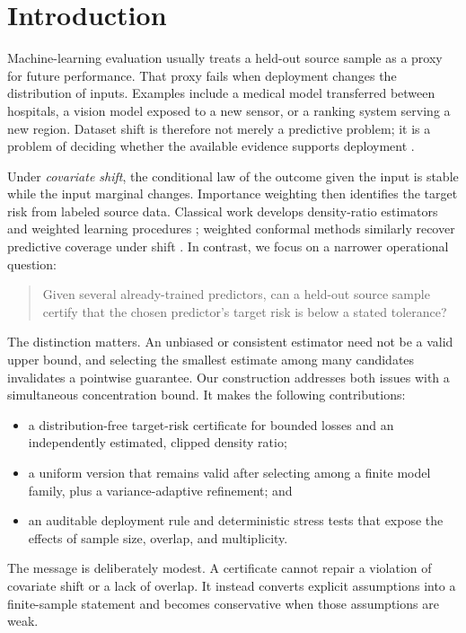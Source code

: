 \section{Introduction}
\label{sec:introduction}

Machine-learning evaluation usually treats a held-out source sample as a proxy for
future performance.  That proxy fails when deployment changes the distribution of
inputs.  Examples include a medical model transferred between hospitals, a vision
model exposed to a new sensor, or a ranking system serving a new region.  Dataset
shift is therefore not merely a predictive problem; it is a problem of deciding
whether the available evidence supports deployment \citep{quionero2009dataset}.

Under \emph{covariate shift}, the conditional law of the outcome given the input is
stable while the input marginal changes.  Importance weighting then identifies the
target risk from labeled source data.  Classical work develops density-ratio
estimators and weighted learning procedures \citep{sugiyama2007direct}; weighted
conformal methods similarly recover predictive coverage under shift
\citep{tibshirani2019conformal}.  In contrast, we focus on a narrower operational
question:
\begin{quote}
\small
Given several already-trained predictors, can a held-out source sample certify
that the chosen predictor's target risk is below a stated tolerance?
\end{quote}

The distinction matters.  An unbiased or consistent estimator need not be a valid
upper bound, and selecting the smallest estimate among many candidates invalidates
a pointwise guarantee.  Our construction addresses both issues with a simultaneous
concentration bound.  It makes the following contributions:
\begin{itemize}
  \item a distribution-free target-risk certificate for bounded losses and an
        independently estimated, clipped density ratio;
  \item a uniform version that remains valid after selecting among a finite model
        family, plus a variance-adaptive refinement; and
  \item an auditable deployment rule and deterministic stress tests that expose
        the effects of sample size, overlap, and multiplicity.
\end{itemize}

The message is deliberately modest.  A certificate cannot repair a violation of
covariate shift or a lack of overlap.  It instead converts explicit assumptions
into a finite-sample statement and becomes conservative when those assumptions are
weak.
